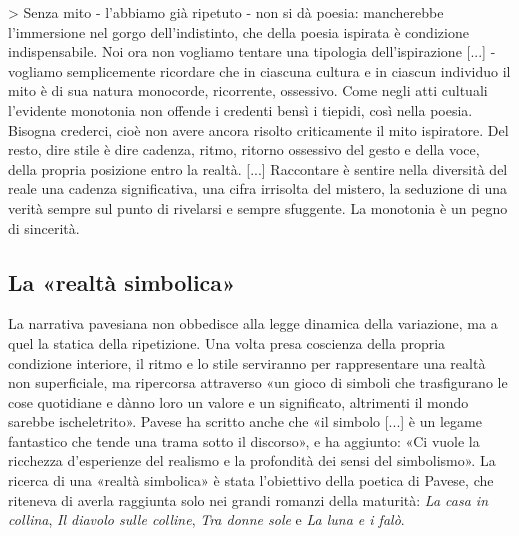 > Senza mito - l'abbiamo già ripetuto - non si dà poesia: mancherebbe l'immersione nel gorgo dell'indistinto, che della poesia ispirata è condizione indispensabile. Noi ora non vogliamo tentare una tipologia dell'ispirazione [...] - vogliamo semplicemente ricordare che in ciascuna cultura e in ciascun individuo il mito è di sua natura monocorde, ricorrente, ossessivo. Come negli atti cultuali l'evidente monotonia non offende i credenti bensì i tiepidi, così nella poesia. Bisogna crederci, cioè non avere ancora risolto criticamente il mito ispiratore. Del resto, dire stile è dire cadenza, ritmo, ritorno ossessivo del gesto e della voce, della propria posizione entro la realtà. [...] Raccontare è sentire nella diversità del reale una cadenza significativa, una cifra irrisolta del mistero, la seduzione di una verità sempre sul punto di rivelarsi e sempre sfuggente. La monotonia è un pegno di sincerità.

\subsection{La «realtà simbolica»}

La narrativa pavesiana non obbedisce alla legge dinamica della variazione, ma a quel la statica della ripetizione. Una volta presa coscienza della propria condizione interiore, il ritmo e lo stile serviranno per rappresentare una realtà non superficiale, ma ripercorsa attraverso «un gioco di simboli che trasfigurano le cose quotidiane e dànno loro un valore e un significato, altrimenti il mondo sarebbe ischeletrito». Pavese ha scritto anche che «il simbolo [...] è un legame fantastico che tende una trama sotto il discorso», e ha aggiunto: «Ci vuole la ricchezza d'esperienze del realismo e la profondità dei sensi del simbolismo». La ricerca di una «realtà simbolica» è stata l'obiettivo della poetica di Pavese, che riteneva di averla raggiunta solo nei grandi romanzi della maturità: \textit{La casa in collina}, \textit{Il diavolo sulle colline}, \textit{Tra donne sole} e \textit{La luna e i falò}.

